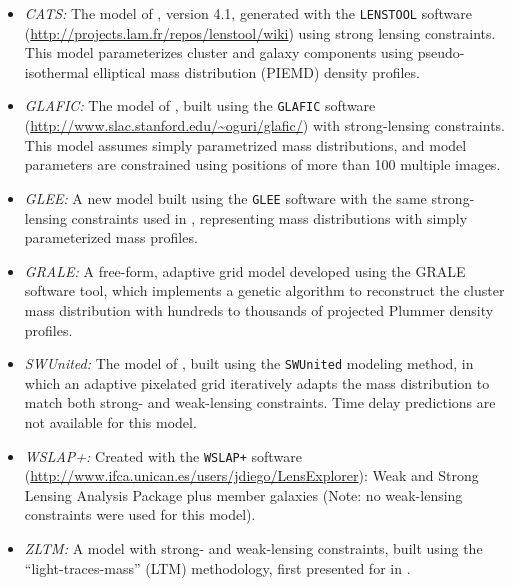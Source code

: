 \begin{itemize}
\item{\it CATS:} The model of , version 4.1,
  generated with the {\tt LENSTOOL} software
  (\url{http://projects.lam.fr/repos/lenstool/wiki})\citep{Jullo:2007}
  using strong lensing constraints.  This model parameterizes cluster
  and galaxy components using pseudo-isothermal elliptical mass
  distribution (PIEMD) density profiles\citep{Kassiola:1993,
    Limousin:2007}.
\item{\it GLAFIC:} The model of , built using
  the {\tt GLAFIC} software
  (\url{http://www.slac.stanford.edu/~oguri/glafic/})\citep{Oguri:2010b}
  with strong-lensing constraints. This model assumes simply
  parametrized mass distributions, and model parameters are
  constrained using positions of more than 100 multiple images.
\item{\it GLEE:} A new model built using the {\tt GLEE}
  software\citep{Suyu:2010b, Suyu:2012} with the same strong-lensing
  constraints used in , representing mass
  distributions with simply parameterized mass profiles.
\item{\it GRALE:} A free-form, adaptive grid model developed using
  the GRALE software tool\citep{Liesenborgs:2006, Liesenborgs:2007,
    Mohammed:2014, Sebesta:2016}, which implements a genetic algorithm
  to reconstruct the cluster mass distribution with hundreds to
  thousands of projected Plummer\citet{Plummer:1911} density profiles.
\item{\it SWUnited:} The model of , built using the
  {\tt SWUnited} modeling method\citep{Bradac:2005, Bradac:2009}, in
  which an adaptive pixelated grid iteratively adapts the mass
  distribution to match both strong- and weak-lensing constraints.
  Time delay predictions are not available for this model.
\item{\it WSLAP+:} Created with the {\tt WSLAP+} software
  (\url{http://www.ifca.unican.es/users/jdiego/LensExplorer})\citep{Sendra:2014}:
  Weak and Strong Lensing Analysis Package plus member galaxies (Note:
  no weak-lensing constraints were used for this  model).
\item{\it ZLTM:} A model with strong- and weak-lensing constraints,
  built using the ``light-traces-mass'' (LTM)
  methodology\citep{Zitrin:2009a, Zitrin:2015}, first presented for
   in .
\end{itemize}

